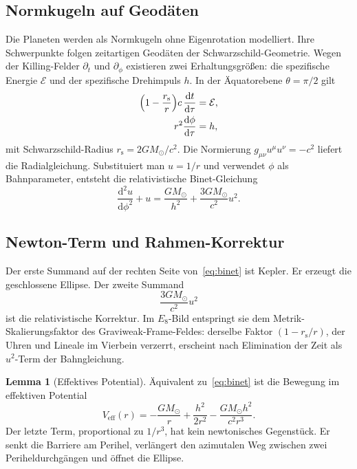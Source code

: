 \documentclass[11pt,a4paper]{article}
\theoremstyle{definition}
\newtheorem{lemma}[satz]{Lemma}
\theoremstyle{remark}
\newcommand{\rs}{r_{\mathrm{s}}}
\newcommand{\MS}{M_{\odot}}
\begin{document}
\subsection{Normkugeln auf Geodäten}

Die Planeten werden als Normkugeln ohne Eigenrotation modelliert. Ihre Schwerpunkte folgen zeitartigen Geodäten der Schwarzschild-Geometrie. Wegen der Killing-Felder \(\partial_t\) und \(\partial_\phi\) existieren zwei Erhaltungsgrößen: die spezifische Energie \(\mathcal{E}\) und der spezifische Drehimpuls \(h\). In der Äquatorebene \(\theta=\pi/2\) gilt
\begin{align}
\Bigl(1-\frac{\rs}{r}\Bigr)c\,\frac{\mathrm{d}t}{\mathrm{d}\tau}&=\mathcal{E},\\
r^2\frac{\mathrm{d}\phi}{\mathrm{d}\tau}&=h,
\end{align}
mit Schwarzschild-Radius \(\rs=2G\MS/c^2\). Die Normierung \(g_{\mu\nu}u^\mu u^\nu=-c^2\) liefert die Radialgleichung. Substituiert man \(u=1/r\) und verwendet \(\phi\) als Bahnparameter, entsteht die relativistische Binet-Gleichung
\begin{equation}
\label{eq:binet}
\frac{\mathrm{d}^2 u}{\mathrm{d}\phi^2}+u=\frac{G\MS}{h^2}+\frac{3G\MS}{c^2}u^2.
\end{equation}

\subsection{Newton-Term und Rahmen-Korrektur}

Der erste Summand auf der rechten Seite von~\eqref{eq:binet} ist Kepler. Er erzeugt die geschlossene Ellipse. Der zweite Summand
\begin{equation}
\frac{3G\MS}{c^2}u^2
\end{equation}
ist die relativistische Korrektur. Im \(E_8\)-Bild entspringt sie dem Metrik-Skalierungsfaktor des Graviweak-Frame-Feldes: derselbe Faktor \((1-\rs/r)\), der Uhren und Lineale im Vierbein verzerrt, erscheint nach Elimination der Zeit als \(u^2\)-Term der Bahngleichung.

\begin{lemma}[Effektives Potential]
Äquivalent zu~\eqref{eq:binet} ist die Bewegung im effektiven Potential
\begin{equation}
V_{\mathrm{eff}}(r)=-\frac{G\MS}{r}+\frac{h^2}{2r^2}-\frac{G\MS h^2}{c^2 r^3}.
\end{equation}
Der letzte Term, proportional zu \(1/r^3\), hat kein newtonisches Gegenstück. Er senkt die Barriere am Perihel, verlängert den azimutalen Weg zwischen zwei Periheldurchgängen und öffnet die Ellipse.
\end{lemma}
\end{document}
